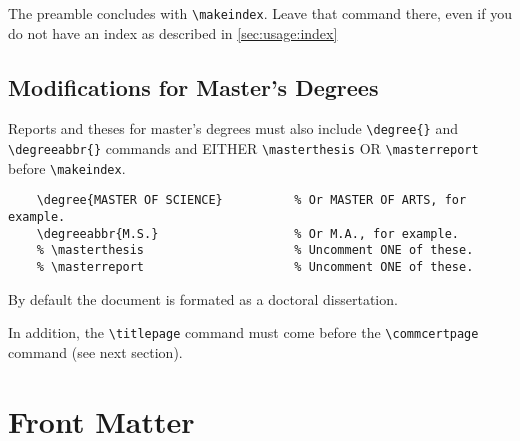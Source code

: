 The preamble concludes with \verb+\makeindex+.
Leave that command there, even if you do not have an index as described in \ref{sec:usage:index}

\subsection{Modifications for Master's Degrees} %

Reports and theses for master's degrees must also include \verb+\degree{}+ and \verb+\degreeabbr{}+ commands and EITHER \verb+\masterthesis+ OR \verb+\masterreport+ before \verb+\makeindex+.
\begin{verbatim}
    \degree{MASTER OF SCIENCE}          % Or MASTER OF ARTS, for example.
    \degreeabbr{M.S.}                   % Or M.A., for example.
    % \masterthesis                     % Uncomment ONE of these.
    % \masterreport                     % Uncomment ONE of these.
\end{verbatim}
By default the document is formated as a doctoral dissertation.

In addition, the \verb+\titlepage+ command must come before the \verb+\commcertpage+ command (see next section).

\section{Front Matter} %

